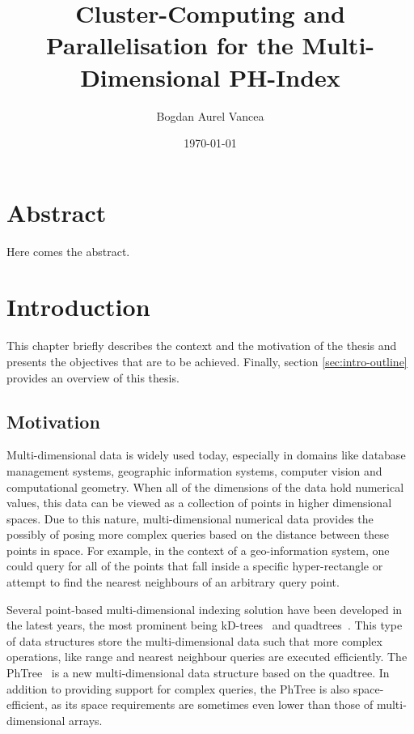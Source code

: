 \documentclass[11pt,a4paper]{globis-book}
\title{Cluster-Computing and Parallelisation for the
    Multi-Dimensional PH-Index}
\author{Bogdan Aurel Vancea}
\institute{Institute of Information Systems}
\date{\today}
\begin{document}
\frontmatter
\maketitlepage
\cleardoublepage
{}

\chapter*{Abstract}

Here comes the abstract.

\tableofcontents

\mainmatter


\chapter{Introduction}
\label{ch:intro}
This chapter briefly describes the context and the motivation of the thesis and presents the objectives that are to be achieved. Finally, section \ref{sec:intro-outline} provides an overview of this thesis.

\section{Motivation}
\label{sec:intro-motivation}
Multi-dimensional data is widely used today, especially in domains like database management systems, geographic information systems, computer vision and computational geometry. When all of the dimensions of the data hold numerical values, this data can be viewed as a collection of points in higher dimensional spaces. Due to this nature, multi-dimensional numerical data provides the possibly of posing more complex queries based on the distance between these points in space. For example, in the context of a geo-information system, one could query for all of the points that fall inside a specific hyper-rectangle or attempt to find the nearest neighbours of an arbitrary query point.

Several point-based multi-dimensional indexing solution have been developed in the latest years, the most prominent being kD-trees~\cite{Bentley1975} and quadtrees~\cite{FinkelB74}. This type of data structures store the multi-dimensional data such that more complex operations, like range and nearest neighbour queries are executed efficiently. The PhTree~\cite{Zaschke2014} is a new multi-dimensional data structure based on the quadtree. In addition to providing support for complex queries, the PhTree is also space-efficient, as its space requirements are sometimes even lower than those of multi-dimensional arrays. 
\end{document}
